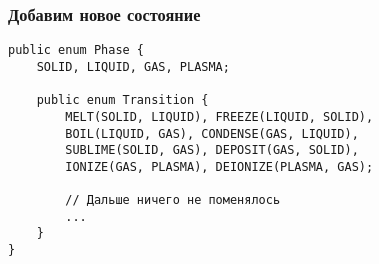 \documentclass[xetex,mathserif,serif]{beamer}
\begin{document}
	\begin{frame}[fragile]
		\frametitle{Добавим новое состояние}
		\begin{small}
			\begin{verbatim}
public enum Phase {
    SOLID, LIQUID, GAS, PLASMA;
    
    public enum Transition {
        MELT(SOLID, LIQUID), FREEZE(LIQUID, SOLID),
        BOIL(LIQUID, GAS), CONDENSE(GAS, LIQUID),
        SUBLIME(SOLID, GAS), DEPOSIT(GAS, SOLID),
        IONIZE(GAS, PLASMA), DEIONIZE(PLASMA, GAS);

        // Дальше ничего не поменялось
        ...
    }
}
			\end{verbatim}
		\end{small}
	\end{frame}
\end{document}
